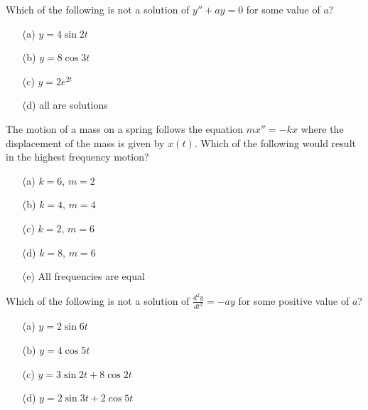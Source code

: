 \begin{problem}
    Which of the following is not a solution of $y'' + ay = 0$ for some value of $a$?

\begin{enumerate}
    \item[(a)] $y = 4 \sin 2 t$
    \item[(b)] $y = 8 \cos 3 t$
    \item[(c)] $y = 2 e^{2t}$
    \item[(d)] all are solutions
\end{enumerate}
\end{problem}
%             


\begin{problem}
    The motion of a mass on a spring follows the equation $m x'' = -k x$ where the
    displacement of the mass is given by $x(t)$.  Which of the following would result in
    the highest frequency motion?
\begin{enumerate}
    \item[(a)] $k = 6$, $m=2$
    \item[(b)] $k=4$, $m=4$
    \item[(c)] $k=2$, $m=6$
    \item[(d)] $k = 8$, $m = 6$
    \item[(e)] All frequencies are equal
\end{enumerate}
\end{problem}
%             


\begin{problem}
    Which of the following is not a solution of $\frac{d^2 y}{dt^2} = - a y$ for some
    positive value of $a$?
\begin{enumerate}
    \item[(a)] $y = 2 \sin 6t$
    \item[(b)] $y = 4 \cos 5t$
    \item[(c)] $y = 3 \sin 2t + 8 \cos 2t$
    \item[(d)] $y = 2 \sin 3t + 2 \cos 5t$
\end{enumerate}
\end{problem}
%             


